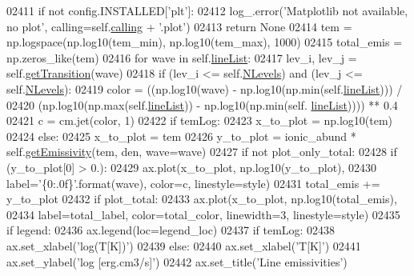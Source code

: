 \begin{DoxyCode}
02411         \textcolor{keywordflow}{if} \textcolor{keywordflow}{not} config.INSTALLED[\textcolor{stringliteral}{'plt'}]: 
02412             log\_.error(\textcolor{stringliteral}{'Matplotlib not available, no plot'}, calling=self.\hyperlink{classpyneb_1_1core_1_1pynebcore_1_1_atom_a373b7735acf4f528b54bddf373ad67a1}{calling} + \textcolor{stringliteral}{'.plot'})
02413             \textcolor{keywordflow}{return} \textcolor{keywordtype}{None}
02414         tem = np.logspace(np.log10(tem\_min), np.log10(tem\_max), 1000)
02415         total\_emis = np.zeros\_like(tem)
02416         \textcolor{keywordflow}{for} wave \textcolor{keywordflow}{in} self.\hyperlink{classpyneb_1_1core_1_1pynebcore_1_1_atom_a8280ef5632977a7cf7e8fe4c63127703}{lineList}:
02417             lev\_i, lev\_j = self.\hyperlink{classpyneb_1_1core_1_1pynebcore_1_1_atom_a7c9f17a3d9e841267add92377d9d1ede}{getTransition}(wave)
02418             \textcolor{keywordflow}{if} (lev\_i <= self.\hyperlink{classpyneb_1_1core_1_1pynebcore_1_1_atom_a6b43c1e6431a6786c1b4267f704fb4e8}{NLevels}) \textcolor{keywordflow}{and} (lev\_j <= self.\hyperlink{classpyneb_1_1core_1_1pynebcore_1_1_atom_a6b43c1e6431a6786c1b4267f704fb4e8}{NLevels}):
02419                 color = ((np.log10(wave) - np.log10(np.min(self.\hyperlink{classpyneb_1_1core_1_1pynebcore_1_1_atom_a8280ef5632977a7cf7e8fe4c63127703}{lineList}))) / 
02420                          (np.log10(np.max(self.\hyperlink{classpyneb_1_1core_1_1pynebcore_1_1_atom_a8280ef5632977a7cf7e8fe4c63127703}{lineList})) - np.log10(np.min(self.
      \hyperlink{classpyneb_1_1core_1_1pynebcore_1_1_atom_a8280ef5632977a7cf7e8fe4c63127703}{lineList})))) ** 0.4
02421                 c = cm.jet(color, 1)
02422                 \textcolor{keywordflow}{if} temLog:
02423                     x\_to\_plot = np.log10(tem)
02424                 \textcolor{keywordflow}{else}:
02425                     x\_to\_plot = tem
02426                 y\_to\_plot = ionic\_abund * self.\hyperlink{classpyneb_1_1core_1_1pynebcore_1_1_atom_aaf4e84a9d5f835e6284bd9302314f775}{getEmissivity}(tem, den, wave=wave)
02427                 \textcolor{keywordflow}{if} \textcolor{keywordflow}{not} plot\_only\_total:
02428                     \textcolor{keywordflow}{if} (y\_to\_plot[0] > 0.):
02429                         ax.plot(x\_to\_plot, np.log10(y\_to\_plot),
02430                              label=\textcolor{stringliteral}{'\{0:.0f\}'}.format(wave), color=c, linestyle=style)
02431                 total\_emis += y\_to\_plot
02432         \textcolor{keywordflow}{if} plot\_total:
02433             ax.plot(x\_to\_plot, np.log10(total\_emis),
02434                      label=total\_label, color=total\_color, linewidth=3, linestyle=style)
02435         \textcolor{keywordflow}{if} legend:
02436             ax.legend(loc=legend\_loc)
02437         \textcolor{keywordflow}{if} temLog:
02438             ax.set\_xlabel(\textcolor{stringliteral}{'log(T[K])'})
02439         \textcolor{keywordflow}{else}:
02440             ax.set\_xlabel(\textcolor{stringliteral}{'T[K]'})
02441         ax.set\_ylabel(\textcolor{stringliteral}{'log [erg.cm3/s]'})
02442         ax.set\_title(\textcolor{stringliteral}{'Line emissivities'})

\end{DoxyCode}
